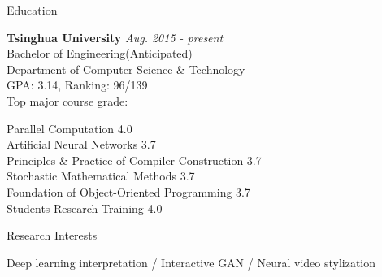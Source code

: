 \documentclass{resume} %
\begin{document}
    
    
    \begin{rSection}{Education}
    
    {\bf Tsinghua University} \hfill {\em Aug. 2015 - present} \\ 
    Bachelor of Engineering(Anticipated) \\
    Department of  Computer Science \& Technology \\
    GPA: 3.14, Ranking: 96/139 \\
    Top major course grade:
    \begin{multicols}{2}
    Parallel Computation 4.0 \\
    Artificial Neural Networks 3.7 \\
    Principles \& Practice of Compiler Construction 3.7 \\
    Stochastic Mathematical Methods 3.7 \\
    Foundation of Object-Oriented Programming 3.7 \\
    Students Research Training 4.0
    \end{multicols}
    \end{rSection}
    
    
    \begin{rSection}{Research Interests}
        
    Deep learning interpretation / Interactive GAN / Neural video stylization
    
    \end{rSection}
\end{document}
